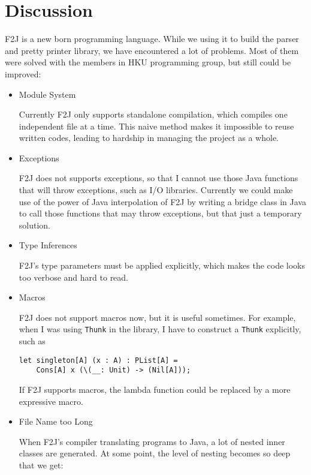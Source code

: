 \chapter{Discussion}

F2J is a new born programming language. While we using it to build the parser and pretty printer library, we have encountered a lot of problems. Most of them were solved with the members in HKU programming group, but still could be improved:

\begin{itemize}
\item Module System

Currently F2J only supports standalone compilation, which compiles one independent file at a time. This naive method makes it impossible to reuse written codes, leading to hardship in managing the project as a whole.

\item Exceptions

F2J does not supports exceptions, so that I cannot use those Java functions that will throw exceptions, such as I/O libraries. Currently we could make use of the power of Java interpolation of F2J by writing a bridge class in Java to call those functions that may throw exceptions, but that just a temporary solution.

\item Type Inferences

F2J's type parameters must be applied explicitly, which makes the code looks too verbose and hard to read.

\item Macros

F2J does not support macros now, but it is useful sometimes. For example, when I was using \texttt{Thunk} in the library, I have to construct a \texttt{Thunk} explicitly, such as

\begin{lstlisting}
let singleton[A] (x : A) : PList[A] =
    Cons[A] x (\(__: Unit) -> (Nil[A]));
\end{lstlisting}

If F2J supports macros, the lambda function could be replaced by a more expressive macro.

\item File Name too Long

When F2J's compiler translating programs to Java, a lot of nested inner classes are generated. At some point, the level of nesting becomes so deep that we get:


\end{itemize}
